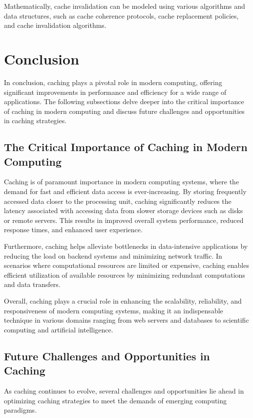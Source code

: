\documentclass[12pt]{book} %
\begin{document}
Mathematically, cache invalidation can be modeled using various algorithms and data structures, such as cache coherence protocols, cache replacement policies, and cache invalidation algorithms.


\section{Conclusion}
In conclusion, caching plays a pivotal role in modern computing, offering significant improvements in performance and efficiency for a wide range of applications. The following subsections delve deeper into the critical importance of caching in modern computing and discuss future challenges and opportunities in caching strategies.

\subsection{The Critical Importance of Caching in Modern Computing}
Caching is of paramount importance in modern computing systems, where the demand for fast and efficient data access is ever-increasing. By storing frequently accessed data closer to the processing unit, caching significantly reduces the latency associated with accessing data from slower storage devices such as disks or remote servers. This results in improved overall system performance, reduced response times, and enhanced user experience.

Furthermore, caching helps alleviate bottlenecks in data-intensive applications by reducing the load on backend systems and minimizing network traffic. In scenarios where computational resources are limited or expensive, caching enables efficient utilization of available resources by minimizing redundant computations and data transfers.

Overall, caching plays a crucial role in enhancing the scalability, reliability, and responsiveness of modern computing systems, making it an indispensable technique in various domains ranging from web servers and databases to scientific computing and artificial intelligence.

\subsection{Future Challenges and Opportunities in Caching}
As caching continues to evolve, several challenges and opportunities lie ahead in optimizing caching strategies to meet the demands of emerging computing paradigms. 
\end{document}
